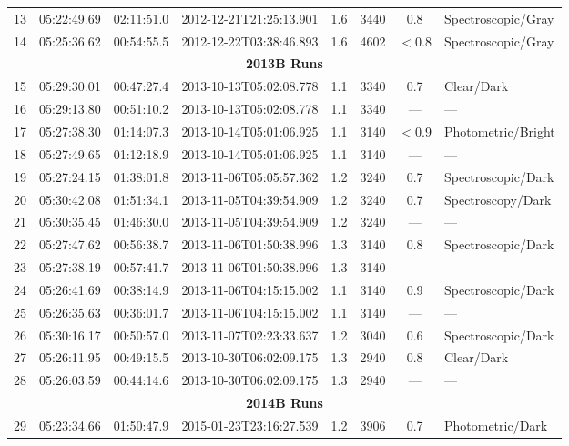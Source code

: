 \documentclass[12pt]{article}
\begin{document}
\begin{table}
\begin{center}
\begin{threeparttable}
\begin{tabular}{lccccccl}
	13 & 05:22:49.69 & 02:11:51.0 & 2012-12-21T21:25:13.901 & 1.6  & 3440 & 0.8      & Spectroscopic/Gray  \\
	14 & 05:25:36.62 & 00:54:55.5 & 2012-12-22T03:38:46.893 & 1.6  & 4602 & $<$0.8   & Spectroscopic/Gray  \\
	\multicolumn{8}{c}{{\bf 2013B Runs}} \\
	15 & 05:29:30.01 & 00:47:27.4 & 2013-10-13T05:02:08.778 & 1.1  & 3340 & 0.7      & Clear/Dark          \\
	16 & 05:29:13.80 & 00:51:10.2 & 2013-10-13T05:02:08.778 & 1.1  & 3340 & ---      & ---                 \\
	17 & 05:27:38.30 & 01:14:07.3 & 2013-10-14T05:01:06.925 & 1.1  & 3140 & $<$0.9   & Photometric/Bright  \\
	18 & 05:27:49.65 & 01:12:18.9 & 2013-10-14T05:01:06.925 & 1.1  & 3140 & ---      & ---                 \\
	19 & 05:27:24.15 & 01:38:01.8 & 2013-11-06T05:05:57.362 & 1.2  & 3240 & 0.7      & Spectroscopic/Dark  \\
	20 & 05:30:42.08 & 01:51:34.1 & 2013-11-05T04:39:54.909 & 1.2  & 3240 & 0.7      & Spectroscopy/Dark   \\
	21 & 05:30:35.45 & 01:46:30.0 & 2013-11-05T04:39:54.909 & 1.2  & 3240 & ---      & ---                 \\
	22 & 05:27:47.62 & 00:56:38.7 & 2013-11-06T01:50:38.996 & 1.3  & 3140 & 0.8      & Spectroscopic/Dark  \\
	23 & 05:27:38.19 & 00:57:41.7 & 2013-11-06T01:50:38.996 & 1.3  & 3140 & ---      & ---                 \\
	24 & 05:26:41.69 & 00:38:14.9 & 2013-11-06T04:15:15.002 & 1.1  & 3140 & 0.9      & Spectroscopic/Dark  \\
	25 & 05:26:35.63 & 00:36:01.7 & 2013-11-06T04:15:15.002 & 1.1  & 3140 & ---      & ---                 \\
	26 & 05:30:16.17 & 00:50:57.0 & 2013-11-07T02:23:33.637 & 1.2  & 3040 & 0.6      & Spectroscopic/Dark  \\
	27 & 05:26:11.95 & 00:49:15.5 & 2013-10-30T06:02:09.175 & 1.3  & 2940 & 0.8      & Clear/Dark          \\
	28 & 05:26:03.59 & 00:44:14.6 & 2013-10-30T06:02:09.175 & 1.3  & 2940 & ---      & ---                 \\
	\multicolumn{8}{c}{{\bf 2014B Runs}} \\
	29 & 05:23:34.66 & 01:50:47.9 & 2015-01-23T23:16:27.539 & 1.2  & 3906 & 0.7      & Photometric/Dark    \\

\end{tabular}
\end{threeparttable}
\end{center}
\end{table}
\end{document}
